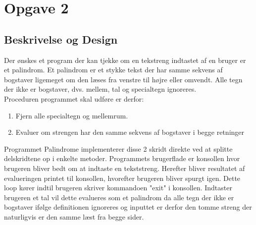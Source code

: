 \section{Opgave 2}
\subsection{Beskrivelse og Design}
	Der ønskes et program der kan tjekke om en tekstreng indtastet af en bruger er et palindrom. Et 	palindrom er et stykke tekst der har samme sekvens af bogstaver ligemeget om den læses fra 			venstre til højre eller omvendt. Alle tegn der ikke er bogstaver, dvs. mellem, tal og 				specialtegn ignoreres. \\
	Proceduren programmet skal udføre er derfor:
	\begin{enumerate}
		\item Fjern alle specialtegn og mellemrum.
		\item Evaluer om strengen har den samme sekvens af bogstaver i begge retninger
	\end{enumerate}
	Programmet Palindrome implementerer disse 2 skridt direkte ved at splitte delskridtene op i enkelte metoder.
	Programmets brugerflade er konsollen hvor brugeren bliver bedt om at indtaste en tekststreng. Herefter bliver resultatet af evalueringen printet til konsollen, hvorefter brugeren bliver spurgt igen. Dette loop kører indtil brugeren skriver kommandoen "exit" i konsollen. Indtaster brugeren et tal vil dette evalueres som et palindrom da alle tegn der ikke er bogstaver ifølge definitionen ignoreres og inputtet er derfor den tomme streng der naturligvis er den samme læst fra begge sider. 
	
	
